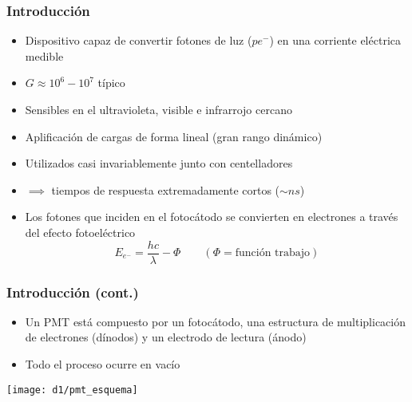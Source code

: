 \documentclass{beamer}
\begin{document}
\begin{frame}
\frametitle{Introducción}
\begin{block}{}
\begin{itemize}
\item Dispositivo capaz de convertir fotones de luz ($pe^-$) en una corriente eléctrica
medible
\item $G \approx 10^6 - 10^7$ típico
\item Sensibles en el {\color{blue}ultravioleta, visible e infrarrojo cercano}
\item Aplificación de cargas de forma \alert{lineal} ({\color{blue}gran rango
dinámico})
\item Utilizados casi invariablemente junto con {\color{blue}centelladores}
\item $\implies$ tiempos de respuesta extremadamente cortos ($\sim ns$)
\item Los fotones que inciden en el fotocátodo se convierten en
electrones a través del \alert{efecto fotoeléctrico}
$$E_{e^-} = \frac{hc}{\lambda} - \Phi \qquad (\Phi = \text{función
trabajo})$$
\end{itemize}
\end{block}
\end{frame} 

\begin{frame}
\frametitle{Introducción (cont.)}
\begin{itemize}
\item Un PMT está compuesto por un \alert{fotocátodo}, una
estructura de multiplicación de electrones (\alert{dínodos}) y un electrodo de
lectura (\alert{ánodo})
\item Todo el proceso ocurre en vacío
\end{itemize}
\texttt{[image: d1/pmt\_esquema]}
\end{frame} 
\end{document}
